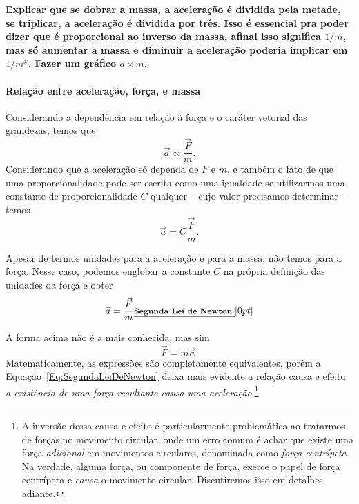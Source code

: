 \textbf{Explicar que se dobrar a massa, a aceleração é dividida pela metade, se triplicar, a aceleração é dividida por três. Isso é essencial pra poder dizer que é proporcional ao inverso da massa, afinal isso significa $1/m$, mas só aumentar a massa e diminuir a aceleração poderia implicar em $1/m^x$. Fazer um gráfico $a \times m$.}

\paragraph{Relação entre aceleração, força, e massa}

Considerando a dependência em relação à força e o caráter vetorial das grandezas, temos que
\begin{equation}
  \vec{a} \propto \frac{\vec{F}}{m}.
\end{equation}
%
Considerando que a aceleração só dependa de $F$ e $m$, e também o fato de que uma proporcionalidade pode ser escrita como uma igualdade se utilizarmos uma constante de proporcionalidade $C$ qualquer -- cujo valor precisamos determinar -- temos
\begin{equation}
  \vec{a} = C \frac{\vec{F}}{m}.
\end{equation}

Apesar de termos unidades para a aceleração e para a massa, não temos para a força. Nesse caso, podemos englobar a constante $C$ na própria definição das unidades da força e obter
\begin{equation}\label{Eq:SegundaLeiDeNewton}
  \vec{a} = \frac{\vec{F}}{m} \relax{\footnotesize\emph{\textbf{Segunda Lei de Newton.}}}[0pt]
\end{equation}

A forma acima não é a mais conhecida, mas sim 
\begin{equation}
  \vec{F} = m \vec{a}.
\end{equation}
%
Matematicamente, as expressões são completamente equivalentes, porém a Equação~\ref{Eq:SegundaLeiDeNewton} deixa mais evidente a relação causa e efeito: \emph{a existência de uma força resultante causa uma aceleração}.\footnote{A inversão dessa causa e efeito é particularmente problemática ao tratarmos de forças no movimento circular, onde um erro comum é achar que existe uma força \emph{adicional} em movimentos circulares, denominada como \emph{força centrípeta}. Na verdade, alguma força, ou componente de força, exerce o papel de força centrípeta e \emph{causa} o movimento circular. Discutiremos isso em detalhes adiante.}

